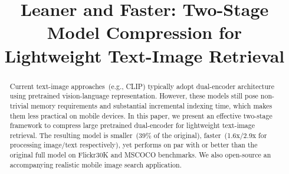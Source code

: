 \documentclass[11pt]{article}
\title{Leaner and Faster: Two-Stage Model Compression for Lightweight Text-Image Retrieval}
\begin{document}
\maketitle
\begin{abstract}
Current text-image approaches~(e.g., CLIP) typically adopt dual-encoder architecture 
using pretrained vision-language representation. 
However, these models still pose non-trivial memory requirements and 
substantial incremental indexing time, which makes them less practical on
mobile devices. In this paper, we present an effective two-stage framework 
to compress large pretrained dual-encoder for lightweight text-image retrieval. 
The resulting model is smaller~(39\% of the original), 
faster~(1.6x/2.9x for processing image/text respectively), yet performs on par with or better than the original full model on Flickr30K and MSCOCO benchmarks. 
We also open-source an accompanying realistic mobile image search application.
\end{abstract}








\end{document}
